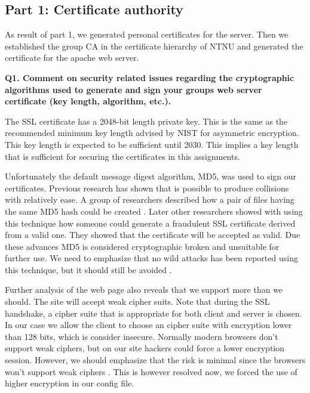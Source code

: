 
\subsection {Part 1: Certificate authority}

As result of part 1, we generated personal certificates for the server. Then we established the group CA in the certificate hierarchy of NTNU and generated the certificate for the apache web server. 
\newline

\noindent
{\bf Q1. Comment on security related issues regarding the cryptographic algorithms used to generate and sign your groups web server certificate (key length, algorithm, etc.).}
\newline

\noindent
The SSL certificate has a 2048-bit length private key. This is the same as the recommended minimum key length advised by NIST for asymmetric encryption. This key length is expected to be sufficient until 2030\cite{nisc}. This implies a key length that is sufficient for securing the certificates in this assignments. 
\newline

\noindent
Unfortunately the default message digest algorithm, MD5, was used to sign our certificates. Previous research has shown that is possible to produce collisions with relatively ease. A group of researchers described how a pair of files having the same MD5 hash could be created \cite{md5Study}. Later other researchers showed with using this technique how someone could generate a fraudulent SSL certificate derived from a valid one. They showed that the certificate will be accepted as valid. \cite{md5Harmful} Due these advances MD5 is considered cryptographic broken and unsuitable for further use. We need to emphasize that no wild attacks has been reported using this technique, but it should still be avoided \cite {md5Wiki, md5Networking}.
\newline

\noindent
Further analysis of the web page also reveals that we support more than we should. The site will accept weak cipher suits. Note that during the SSL handshake, a cipher suite that is appropriate for both client and server is chosen. In our case we allow the client to choose an cipher suite with encryption lower than 128 bits, which is consider insecure. Normally modern browsers don't support weak ciphers, but on our site hackers could force a lower encryption session. However, we should emphasize that the risk is minimal since the browsers won't support weak ciphers \cite {cipher}. This is however resolved now, we forced the use of higher encryption in our config file. 
\newline

  






